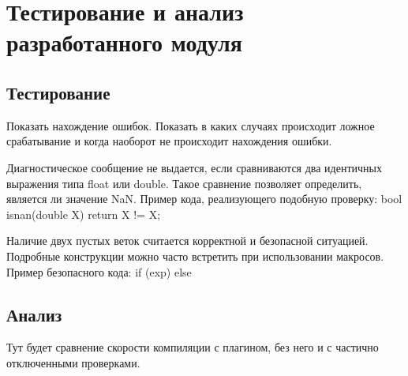 \chapter{Тестирование и анализ разработанного модуля}

\section{Тестирование}
Показать нахождение ошибок. Показать в каких случаях происходит ложное срабатывание и когда
наоборот не происходит нахождения ошибки.


Диагностическое сообщение не выдается, если сравниваются два идентичных выражения типа float или double. 
Такое сравнение позволяет определить, является ли значение NaN. Пример кода, реализующего подобную проверку:
bool isnan(double X) { return X != X; }

Наличие двух пустых веток считается корректной и безопасной ситуацией. Подробные конструкции 
можно часто встретить при использовании макросов. Пример безопасного кода:
if (exp) {
} else {
}
\section{Анализ}

Тут будет сравнение скорости компиляции с плагином, без него и с частично отключенными проверками.